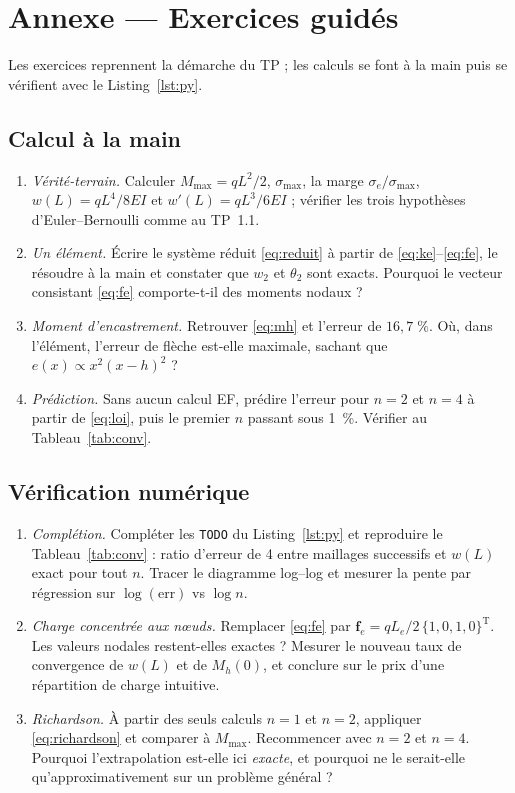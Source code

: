 \documentclass[10pt,journal]{IEEEtran}
\begin{document}
\appendices
\section*{Annexe --- Exercices guidés}
Les exercices reprennent la démarche du TP ; les calculs se font à la main puis se vérifient avec le Listing~\ref{lst:py}.

\subsection{Calcul à la main}
\begin{enumerate}[leftmargin=1.4em]
\item \emph{Vérité-terrain.} Calculer $M_{\max}=qL^2/2$, $\sigma_{\max}$, la marge $\sigma_e/\sigma_{\max}$, $w(L)=qL^4/8EI$ et $w'(L)=qL^3/6EI$ ; vérifier les trois hypothèses d'Euler--Bernoulli comme au TP~1.1.
\item \emph{Un élément.} Écrire le système réduit \eqref{eq:reduit} à partir de \eqref{eq:ke}--\eqref{eq:fe}, le résoudre à la main et constater que $w_2$ et $\theta_2$ sont exacts. Pourquoi le vecteur consistant \eqref{eq:fe} comporte-t-il des moments nodaux ?
\item \emph{Moment d'encastrement.} Retrouver \eqref{eq:mh} et l'erreur de $16{,}7\;\%$. Où, dans l'élément, l'erreur de flèche est-elle maximale, sachant que $e(x)\propto x^2(x-h)^2$ ?
\item \emph{Prédiction.} Sans aucun calcul EF, prédire l'erreur pour $n=2$ et $n=4$ à partir de \eqref{eq:loi}, puis le premier $n$ passant sous 1~\%. Vérifier au Tableau~\ref{tab:conv}.
\end{enumerate}

\subsection{Vérification numérique}
\begin{enumerate}[leftmargin=1.4em]
\item \emph{Complétion.} Compléter les \texttt{TODO} du Listing~\ref{lst:py} et reproduire le Tableau~\ref{tab:conv} : ratio d'erreur de 4 entre maillages successifs et $w(L)$ exact pour tout $n$. Tracer le diagramme log--log et mesurer la pente par régression sur $\log(\text{err})$ vs $\log n$.
\item \emph{Charge concentrée aux n\oe{}uds.} Remplacer \eqref{eq:fe} par $\mathbf{f}_e=qL_e/2\,\{1,0,1,0\}^{\mathrm T}$. Les valeurs nodales restent-elles exactes ? Mesurer le nouveau taux de convergence de $w(L)$ et de $M_h(0)$, et conclure sur le prix d'une répartition de charge \og intuitive\fg{}.
\item \emph{Richardson.} À partir des seuls calculs $n=1$ et $n=2$, appliquer \eqref{eq:richardson} et comparer à $M_{\max}$. Recommencer avec $n=2$ et $n=4$. Pourquoi l'extrapolation est-elle ici \emph{exacte}, et pourquoi ne le serait-elle qu'approximativement sur un problème général ?
\end{enumerate}
\end{document}
